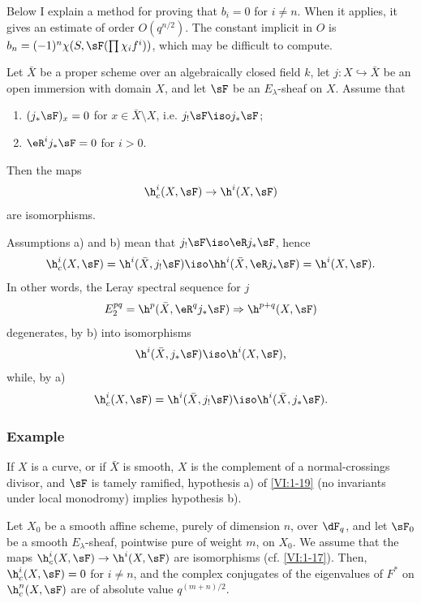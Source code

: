 Below I explain a method for proving that $b_i=0$ for $i\ne n$. 
When it applies, it gives an estimate of order $O(q^{n/2})$. The constant 
implicit in $O$ is $b_n=(-1)^n \chi(S,\sF(\prod \chi_i f^i))$, which may 
be difficult to compute. 





\begin{proposition_}\label{VI:1-19}
Let $\bar X$ be a proper scheme over an algebraically closed field $k$, 
let $j:X\hookrightarrow \bar X$ be an open immersion with domain $X$, and let $\sF$ be an $E_\lambda$-sheaf 
on $X$. Assume that 
\begin{enumerate}[\indent a)]
  \item $(j_\ast\sF)_x = 0$ for $x\in \bar X\setminus X$, i.e. 
    $j_!\sF\iso j_\ast\sF$; 
  \item $\eR^i j_\ast \sF = 0$ for $i>0$.
\end{enumerate}
Then the maps 
\[
  \h_c^i(X,\sF) \to \h^i(X,\sF)
\]
are isomorphisms. 
\end{proposition_}

Assumptions a) and b) mean that $j_! \sF \iso \eR j_\ast \sF$, hence 
\[
  \h_c^i(X,\sF) = \h^i(\bar X,j_!\sF) \iso \hh^i(\bar X,\eR j_\ast \sF) = \h^i(X,\sF) \text{.}
\]
In other words, the Leray spectral sequence for $j$ 
\[
  E_2^{pq} = \h^p(\bar X,\eR^q j_\ast \sF) \Rightarrow \h^{p+q}(X,\sF) 
\]
degenerates, by b) into isomorphisms 
\[
  \h^i(\bar X,j_\ast\sF) \iso \h^i(X,\sF) \text{,}
\]
while, by a) 
\[
  \h_c^i(X,\sF) = \h^i(\bar X,j_!\sF) \iso \h^i(\bar X,j_\ast\sF) \text{.}
\]





\subsubsection{Example}\label{VI:1-19-1}

If $X$ is a curve, or if $\bar X$ is smooth, $X$ is the complement of a 
normal-crossings divisor, and $\sF$ is tamely ramified, 
hypothesis a) of \ref{VI:1-19} (no invariants under local monodromy) 
implies hypothesis b). 





\begin{proposition_}\label{VI:1-20}
Let $X_0$ be a smooth affine scheme, purely of dimension $n$, over $\dF_q$, and let 
$\sF_0$ be a smooth $E_\lambda$-sheaf, pointwise pure of weight $m$, on $X_0$. We 
assume that the maps $\h_c^i(X,\sF) \to \h^i(X,\sF)$ are 
isomorphisms (cf. \ref{VI:1-17}). Then, $\h_c^i(X,\sF) = 0$ for $i\ne n$, and 
the complex conjugates of the eigenvalues of $F^\ast$ on $\h_c^n(X,\sF)$ 
are of absolute value $q^{(m+n)/2}$. 
\end{proposition_}

